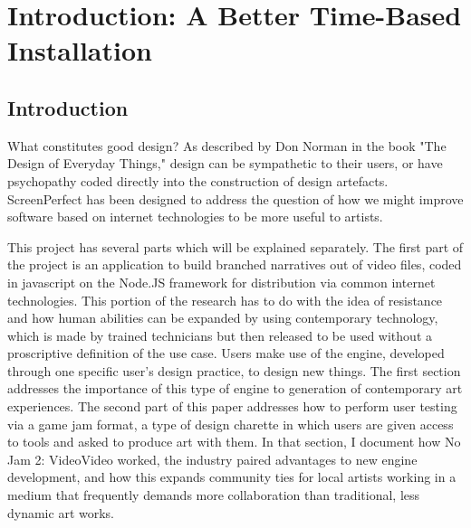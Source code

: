 \chapter{Introduction: A Better Time-Based Installation}\thispagestyle{empty} %

\label{Chapter1} %

\section{Introduction}
What constitutes good design? As described by Don Norman in the book "The Design of Everyday Things," \parencite{norman} design can be sympathetic to their users, or have psychopathy coded directly into the construction of design artefacts. ScreenPerfect has been designed to address the question of how we might improve software based on internet technologies to be more useful to artists. 

This project has several parts which will be explained separately. The first part of the project is an application to build branched narratives out of video files, coded in javascript on the Node.JS framework for distribution via common internet technologies. This portion of the research has to do with the idea of resistance and how human abilities can be expanded by using contemporary technology, which is made by trained technicians but then released to be used without a proscriptive definition of the use case. Users make use of the engine, developed through one specific user's design practice, to design new things. The first section addresses the importance of this type of engine to generation of contemporary art experiences.
The second part of this paper addresses how to perform user testing via a game jam format, a type of design charette in which users are given access to tools and asked to produce art with them. In that section, I document how No Jam 2: VideoVideo worked, the industry paired advantages to new engine development, and how this expands community ties for local artists working in a medium that frequently demands more collaboration than traditional, less dynamic art works.

